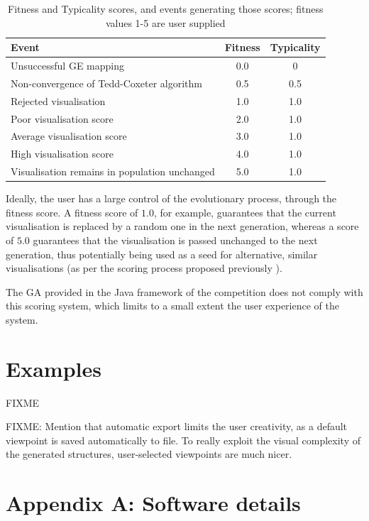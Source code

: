 \documentclass{article}
\begin{document}
\begin{center}
	\begin{table}
	\caption{Fitness and Typicality scores, and events generating those
	scores; fitness values 1-5 are user supplied}
	\begin{tabular}{|l|c|c|}
		\hline
		Event & Fitness & Typicality\\
		\hline
		Unsuccessful GE mapping & 0.0 & 0\\
		\hline
		Non-convergence of Tedd-Coxeter algorithm & 0.5 & 0.5\\
		\hline
		Rejected visualisation & 1.0 & 1.0\\
		\hline
		Poor visualisation score & 2.0 & 1.0\\
		\hline
		Average visualisation score & 3.0 & 1.0\\
		\hline
		High visualisation score & 4.0 & 1.0\\
		\hline
		Visualisation remains in population unchanged & 5.0 & 1.0\\
		\hline
	\end{tabular}
	\label{fittyp}
	\end{table}
\end{center}

Ideally, the user has a large control of the evolutionary process, through the
fitness score. A fitness score of $1.0$, for example, guarantees that the
current visualisation is replaced by a random one in the next generation,
whereas a score of $5.0$ guarantees that the visualisation is passed unchanged
to the next generation, thus potentially being used as a seed for alternative,
similar visualisations (as per the scoring process proposed previously
\cite{nicolau2011a}).

The GA provided in the Java framework of the competition does not comply with
this scoring system, which limits to a small extent the user experience of the
system.

\section{Examples}
FIXME

FIXME: Mention that automatic export limits the user creativity, as a default
viewpoint is saved automatically to file. To really exploit the visual
complexity of the generated structures, user-selected viewpoints are much
nicer.




\section*{Appendix A: Software details}
\end{document}
